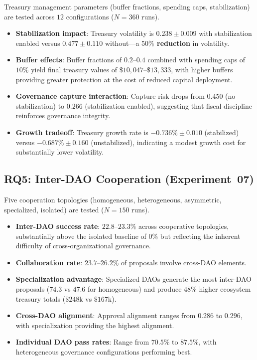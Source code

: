 Treasury management parameters (buffer fractions, spending caps, stabilization) are tested across $12$ configurations ($N=360$ runs).

\begin{itemize}
    \item \textbf{Stabilization impact}: Treasury volatility is $0.238 \pm 0.009$ with stabilization enabled versus $0.477 \pm 0.110$ without---a \textbf{$50\%$ reduction} in volatility.
    \item \textbf{Buffer effects}: Buffer fractions of $0.2$--$0.4$ combined with spending caps of $10\%$ yield final treasury values of $\$10{,}047$--$\$13{,}333$, with higher buffers providing greater protection at the cost of reduced capital deployment.
    \item \textbf{Governance capture interaction}: Capture risk drops from $0.450$ (no stabilization) to $0.266$ (stabilization enabled), suggesting that fiscal discipline reinforces governance integrity.
    \item \textbf{Growth tradeoff}: Treasury growth rate is $-0.736\% \pm 0.010$ (stabilized) versus $-0.687\% \pm 0.160$ (unstabilized), indicating a modest growth cost for substantially lower volatility.
\end{itemize}

\subsection{RQ5: Inter-DAO Cooperation (Experiment~07)}

Five cooperation topologies (homogeneous, heterogeneous, asymmetric, specialized, isolated) are tested ($N=150$ runs).

\begin{itemize}
    \item \textbf{Inter-DAO success rate}: $22.8$--$23.3\%$ across cooperative topologies, substantially above the isolated baseline of $0\%$ but reflecting the inherent difficulty of cross-organizational governance.
    \item \textbf{Collaboration rate}: $23.7$--$26.2\%$ of proposals involve cross-DAO elements.
    \item \textbf{Specialization advantage}: Specialized DAOs generate the most inter-DAO proposals ($74.3$ vs $47.6$ for homogeneous) and produce $48\%$ higher ecosystem treasury totals ($\$248$k vs $\$167$k).
    \item \textbf{Cross-DAO alignment}: Approval alignment ranges from $0.286$ to $0.296$, with specialization providing the highest alignment.
    \item \textbf{Individual DAO pass rates}: Range from $70.5\%$ to $87.5\%$, with heterogeneous governance configurations performing best.
\end{itemize}

